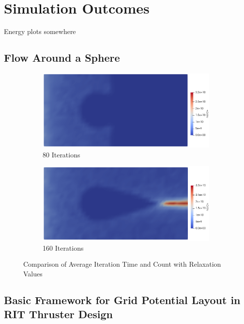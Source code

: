\section{Simulation Outcomes}\label{Sec: Simulation Outcomes}

Energy plots somewhere

\subsection{Flow Around a Sphere}\label{Sec: Flow Around Sphere}
\begin{figure}[H]
    \centering
    \begin{subfigure}[b]{0.49\linewidth}
        \centering
        \includegraphics[width=\linewidth]{figures/Sphere/80_iterations.png}
        \caption{80 Iterations}
        \label{fig:average_iteration_time}
    \end{subfigure}
    \hfill
    \begin{subfigure}[b]{0.49\linewidth}
        \centering
        \includegraphics[width=\linewidth]{figures/Sphere/160_iterations.png}
        \caption{160 Iterations}
        \label{fig:average_iteration_count}
    \end{subfigure}
    \caption{Comparison of Average Iteration Time and Count with Relaxation Values}
    \label{fig:comparison}
\end{figure}


\subsection{Basic Framework for Grid Potential Layout in RIT Thruster Design}